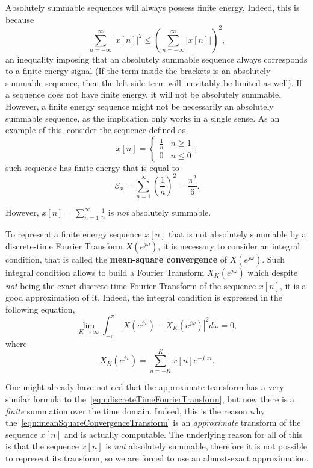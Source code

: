 \documentclass[\documentfontsize, twocolumn]{\classname}
\begin{document}
Absolutely summable sequences will always possess finite energy. Indeed, this is because
\[
    \sum_{n=-\infty}^\infty |x[n]|^2 \leq \left(\sum_{n=-\infty}^\infty |x[n]|\right)^2,
\]
an inequality imposing that an absolutely summable sequence always corresponds to a finite energy signal (If the term inside the brackets is an absolutely summable sequence, then the left-side term will inevitably be limited as well). If a sequence does not have finite energy, it will not be absolutely summable. However, a finite energy sequence might not be necessarily an absolutely summable sequence, as the implication only works in a single sense. As an example of this, consider the sequence defined as
\[
    x[n] = \left\{\begin{array}{ll} \frac 1 n & n \geq 1 \\ 0 & n \leq 0\end{array}\right.;
\]
such sequence has finite energy that is equal to
\[
    \mathcal E_x = \sum_{n=1}^\infty \left(\frac 1 n\right)^2 = \frac {\pi^2}{6}.
\]

However, $x[n] = \sum_{n=1}^\infty \frac 1 n$ is \emph{not} absolutely summable.

To represent a finite energy sequence $x[n]$ that is not absolutely summable by a discrete-time Fourier Transform $X(e^{j\omega})$, it is necessary to consider an integral condition, that is called the \textbf{mean-square convergence} of $X(e^{j\omega})$. Such integral condition allows to build a Fourier Transform $X_K(e^{j\omega})$ which despite \emph{not} being the exact discrete-time Fourier Transform of the sequence $x[n]$, it is a good approximation of it. Indeed, the integral condition is expressed in the following equation,
\begin{equation}\label{eqn:meanSquareConvergence}
    \lim_{K\rightarrow \infty}\int_{-\pi}^\pi \left|X(e^{j\omega}) - X_K(e^{j\omega})\right|^2 d\omega = 0,
\end{equation}
where
\begin{equation}\label{eqn:meanSquareConvergenceTransform}
    X_K(e^{j\omega}) = \sum_{n=-K}^K x[n] e^{-j\omega n}.
\end{equation}

One might already have noticed that the approximate transform has a very similar formula to the~\ref{eqn:discreteTimeFourierTransform}, but now there is a \emph{finite} summation over the time domain. Indeed, this is the reason why the~\ref{eqn:meanSquareConvergenceTransform} is an \emph{approximate} transform of the sequence $x[n]$ and is actually computable. The underlying reason for all of this is that the sequence $x[n]$ is \emph{not} absolutely summable, therefore it is not possible to represent its transform, so we are forced to use an almost-exact approximation.
\end{document}
